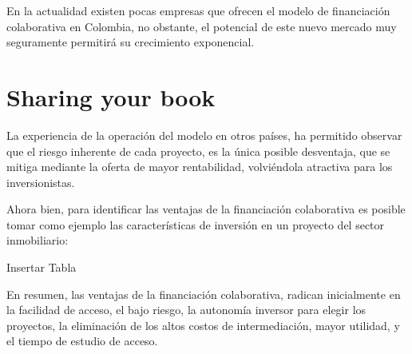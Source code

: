\documentclass[
]{book}
\begin{document}
En la actualidad existen pocas empresas que ofrecen el modelo de financiación colaborativa en Colombia, no obstante, el potencial de este nuevo mercado muy seguramente permitirá su crecimiento exponencial.

\hypertarget{sharing-your-book}{%
\chapter{Sharing your book}\label{sharing-your-book}}

La experiencia de la operación del modelo en otros países, ha permitido observar que el riesgo inherente de cada proyecto, es la única posible desventaja, que se mitiga mediante la oferta de mayor rentabilidad, volviéndola atractiva para los inversionistas.

Ahora bien, para identificar las ventajas de la financiación colaborativa es posible tomar como ejemplo las características de inversión en un proyecto del sector inmobiliario:

Insertar Tabla

En resumen, las ventajas de la financiación colaborativa, radican inicialmente en la facilidad de acceso, el bajo riesgo, la autonomía inversor para elegir los proyectos, la eliminación de los altos costos de intermediación, mayor utilidad, y el tiempo de estudio de acceso.

  
\end{document}
